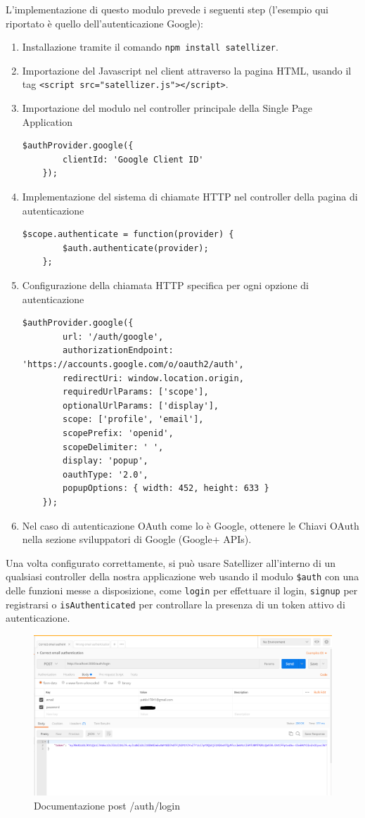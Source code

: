 L'implementazione di questo modulo prevede i seguenti step (l'esempio qui riportato è quello dell'autenticazione Google):
\begin{enumerate}
	\item Installazione tramite il comando \texttt{npm install satellizer}.
	\item Importazione del Javascript nel client attraverso la pagina HTML, usando il tag \texttt{<script src="satellizer.js"></script>}.
	\item Importazione del modulo nel controller principale della Single Page Application
	\begin{lstlisting}[style=JavaScriptCode]
	$authProvider.google({
		clientId: 'Google Client ID'
	});
	\end{lstlisting}
	\item Implementazione del sistema di chiamate HTTP nel controller della pagina di autenticazione
	\begin{lstlisting}[style=JavaScriptCode]
	$scope.authenticate = function(provider) {
		$auth.authenticate(provider);
	};
	\end{lstlisting}
	\item Configurazione della chiamata HTTP specifica per ogni opzione di autenticazione
	\begin{lstlisting}[style=JavaScriptCode]
	$authProvider.google({
		url: '/auth/google',
		authorizationEndpoint: 'https://accounts.google.com/o/oauth2/auth',
		redirectUri: window.location.origin,
		requiredUrlParams: ['scope'],
		optionalUrlParams: ['display'],
		scope: ['profile', 'email'],
		scopePrefix: 'openid',
		scopeDelimiter: ' ',
		display: 'popup',
		oauthType: '2.0',
		popupOptions: { width: 452, height: 633 }
	});
	\end{lstlisting}
	\item Nel caso di autenticazione OAuth come lo è Google, ottenere le Chiavi OAuth nella sezione sviluppatori di Google (Google+ APIs).
\end{enumerate}
Una volta configurato correttamente, si può usare Satellizer all'interno di un qualsiasi controller della nostra applicazione web usando il modulo \texttt{\$auth} con una delle funzioni messe a disposizione, come \texttt{login} per effettuare il login, \texttt{signup} per registrarsi o \texttt{isAuthenticated} per controllare la presenza di un token attivo di autenticazione.  
\begin{figure}[h]
	\centering
	\includegraphics[scale=0.42]{Immagini/correct_auth.png}
	\caption{Documentazione post /auth/login}
\end{figure}
